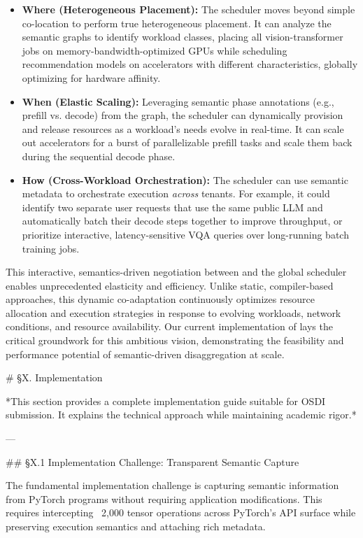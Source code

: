 \begin{itemize}[left=0pt]
    \item \textbf{Where (Heterogeneous Placement):} The scheduler mo\-ves beyond simple co-location to perform true heterogeneous placement. It can analyze the semantic graphs to identify workload classes, placing all vision-transformer jobs on memory-bandwidth-optimized GPUs while scheduling recommendation models on accelerators with different characteristics, globally optimizing for hardware affinity.
    
    \item \textbf{When (Elastic Scaling):} Leveraging semantic phase annotations (e.g., prefill vs. decode) from the graph, the scheduler can dynamically provision and release resources as a workload's needs evolve in real-time. It can scale out accelerators for a burst of parallelizable prefill tasks and scale them back during the sequential decode phase.
    
    \item \textbf{How (Cross-Workload Orchestration):} The scheduler can use semantic metadata to orchestrate execution \textit{across} tenants. For example, it could identify two separate user requests that use the same public LLM and automatically batch their decode steps together to improve throughput, or prioritize interactive, latency-sensitive VQA queries over long-running batch training jobs.
\end{itemize}

This interactive, semantics-driven negotiation between \sys and the global scheduler enables unprecedented elasticity and efficiency. 
Unlike static, compiler-based approaches, this dynamic co-adaptation continuously optimizes resource allocation and execution strategies in response to evolving workloads, network conditions, and resource availability. 
Our current implementation of \sys lays the critical groundwork for this ambitious vision, demonstrating the feasibility and performance potential of semantic-driven disaggregation at scale.


# §X. Implementation

*This section provides a complete implementation guide suitable for OSDI submission. It explains the technical approach while maintaining academic rigor.*

---

## §X.1 Implementation Challenge: Transparent Semantic Capture

The fundamental implementation challenge is capturing semantic information from PyTorch programs without requiring application modifications. This requires intercepting ~2,000 tensor operations across PyTorch's API surface while preserving execution semantics and attaching rich metadata. 

